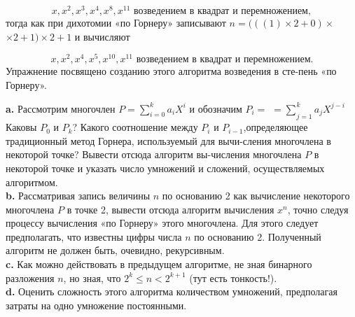 \begin{equation*}
x, x^{2},x^{3},x^{4},x^{8},x^{11} \text{ возведением в квадрат и перемножением},
\end{equation*}
тогда как при дихотомии «по Горнеру» записывают $n= (\left({\left({1}\right)\times{2}+0}\right)\times$\linebreak
$\times{2}+1)\times{2}+1$ и вычисляют 

\begin{equation*}
x, x^{2},x^{4},x^{5},x^{10},x^{11} \text{ возведением в квадрат и перемножением}.
\end{equation*}
Упражнение посвящено созданию этого алгоритма возведения в сте-\linebreak пень «по Горнеру».


\hspace*{15pt}\textbf{a.} Рассмотрим многочлен $P=\sum_{i=0}^k a_{i}X^{i}$ и обозначим $ P_{i}=$\linebreak
$={\sum_{}^{}}_{j=1}^k a_{j}X^{j-i}$ Каковы $P_{0}$ и $P_{k}$? Какого соотношение между $P_{i}$ и $P_{i-1}$,\linebreak определяющее традиционный метод Горнера, используемый для вычи-\linebreak сления многочлена в некоторой точке? Вывести отсюда алгоритм вы-\linebreak числения многочлена $P$ в некоторой точке и указать число умножений и сложений, осуществляемых алгоритмом. \newline
\\
\hspace*{15pt}\textbf{b.} Рассматривая запись величины $n$ по основанию 2 как вычисление некоторого многочлена $P$ в точке 2, вывести отсюда алгоритм вычисления $x^{n}$, точно следуя процессу вычисления «по Горнеру» этого многочлена. Для этого следует предполагать, что известны цифры числа $n$ по основанию 2. Полученный алгоритм не должен быть, очевидно, рекурсивным. \newline
\\
\hspace*{15pt}\textbf{c.} Как можно действовать в предыдущем алгоритме, не зная бинарного разложения $n$, но зная, что $2^{k}\leq{n}<2^{k+1}$ (тут есть тонкость!).\newline
\\
\hspace*{15pt}\textbf{d.} Оценить сложность этого алгоритма количеством умножений, предполагая затраты на одно умножение постоянными. \newline
\\

